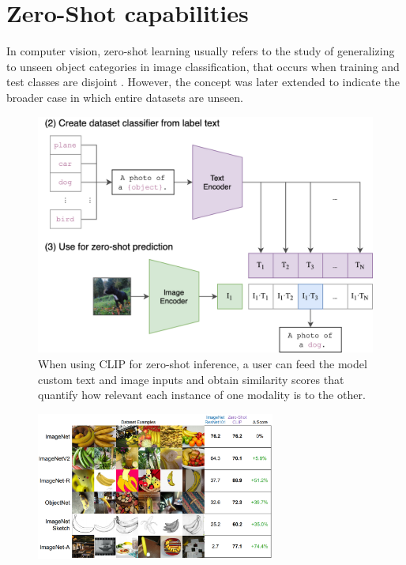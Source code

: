 \documentclass[a4paper, oneside, english]{sapthesis}
\begin{document}
\section{Zero-Shot capabilities}

In computer vision, zero-shot learning usually refers to the study of generalizing to unseen object categories in image classification, that occurs when training and test classes are disjoint \cite{lampert2009learning}. However, the concept was later extended to indicate the broader case in which entire datasets are unseen.


\begin{figure}[h]
    \centering
    \includegraphics[width=\textwidth]{img/CLIP-zero-shot.png}
    \caption{When using CLIP for zero-shot inference, a user can feed the model custom text and image inputs and obtain similarity scores that quantify how relevant each instance of one modality is to the other.}
    \label{fig:clip-zs}
\end{figure}


\begin{figure}[h]
    \centering
    \includegraphics[width=0.7\textwidth]{img/CLIP_zero_shot.png}
    \caption{}
    \label{fig:clipzs}
\end{figure}
\end{document}
